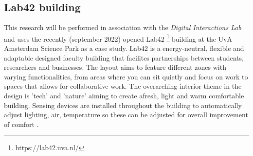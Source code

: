 \subsection{Lab42 building}

This research will be performed in association with the \emph{Digital Interactions Lab} and uses the recently (september 2022) opened Lab42 \footnote{https://lab42.uva.nl/} building at the UvA Amsterdam Science Park as a case study. Lab42 is a energy-neutral, flexible and adaptable designed faculty building that facilites partnerships between students, researchers and businesses. \cite{crouwel} The layout aims to feature different zones with varying functionalities, from areas where you can sit quietly and focus on work to spaces that allows for collaborative work. The overarching interior theme in the design is 'tech' and 'nature' aiming to create afresh, light and warm comfortable building. Sensing devices are installed throughout the building to automatically adjust lighting, air, temperature so these can be adjusted for overall improvement of comfort \cite{faculty}.